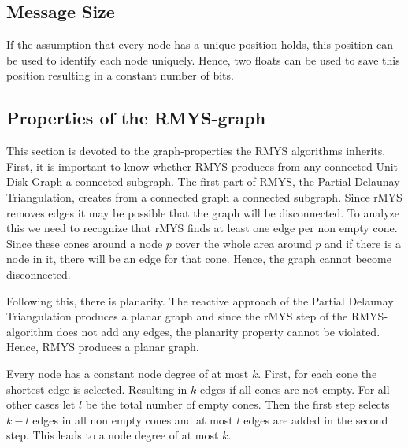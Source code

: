 \subsection{Message Size}
If the assumption that every node has a unique position holds, this position can be used to identify each node uniquely.
Hence, two floats can be used to save this position resulting in a constant number of bits.

\subsection{Properties of the RMYS-graph}
This section is devoted to the graph-properties the RMYS algorithms inherits.
First, it is important to know whether RMYS produces from any connected Unit Disk Graph a connected subgraph.
The first part of RMYS, the Partial Delaunay Triangulation, creates from a connected graph a connected subgraph.
Since rMYS removes edges it may be possible that the graph will be disconnected.
To analyze this we need to recognize that rMYS finds at least one edge per non empty cone.
Since these cones around a node $p $ cover the whole area around $p $ and if there is a node in it, there will be an edge for that cone. %
Hence, the graph cannot become disconnected. 

Following this, there is planarity.
The reactive approach of the Partial Delaunay Triangulation produces a planar graph and since the rMYS step of the RMYS-algorithm does not add any edges, the planarity property cannot be violated.
Hence, RMYS produces a planar graph.

Every node has a constant node degree of at most $k $.
First, for each cone the shortest edge is selected.
Resulting in $k $ edges if all cones are not empty.
For all other cases let $l $ be the total number of empty cones.
Then the first step selects $k-l $ edges in all non empty cones and at most $l $ edges are added in the second step.
This leads to a node degree of at most $k $.


